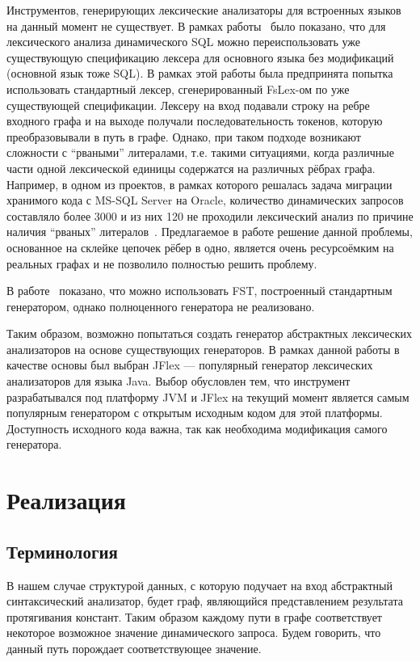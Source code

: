 Инструментов, генерирующих лексические анализаторы для встроенных языков на 
данный момент не существует. В рамках работы~\cite{Grigoriev} было показано, что для 
лексического анализа динамического SQL можно переиспользовать уже существующую 
спецификацию лексера для основного языка без модификаций (основной язык тоже 
SQL). В рамках этой работы была предпринята попытка использовать стандартный 
лексер, сгенерированный FsLex-ом по уже существующей спецификации. Лексеру на 
вход подавали строку на ребре входного графа и на выходе получали последовательность 
токенов, которую преобразовывали в путь в графе. Однако, при таком подходе 
возникают сложности с “рваными” литералами, т.е. такими ситуациями, когда 
различные части одной лексической единицы содержатся на различных рёбрах графа. 
Например, в одном из проектов, в рамках которого решалась задача миграции 
хранимого кода с MS-SQL Server на Oracle, количество динамических запросов 
составляло более 3000 и из них 120 не проходили лексический анализ по причине 
наличия “рваных” литералов~\cite{Grigoriev}. Предлагаемое в работе 
решение  данной проблемы, основанное на склейке цепочек рёбер в одно, является 
очень ресурсоёмким на реальных графах и не позволило полностью решить проблему.

В работе~\cite{ToDetect} показано, что можно использовать FST, построенный стандартным 
генератором, однако полноценного генератора не реализовано.

Таким образом, возможно попытаться создать генератор абстрактных лексических 
анализаторов на основе существующих генераторов. В рамках данной работы в 
качестве основы был выбран JFlex — популярный генератор лексических анализаторов 
для языка Java. Выбор обусловлен тем, что инструмент разрабатывался под платформу 
JVM и JFlex на текущий момент является самым популярным генератором с открытым 
исходным кодом для этой платформы. Доступность исходного кода важна, так как 
необходима модификация самого генератора.

\section{Реализация}
\subsection{Терминология}
В нашем случае структурой данных, с которую подучает на вход абстрактный 
синтаксический анализатор, будет граф, являющийся представлением результата 
протягивания констант. Таким образом каждому пути в графе соответствует некоторое 
возможное значение динамического запроса. Будем говорить, что данный путь 
порождает соответствующее значение.

